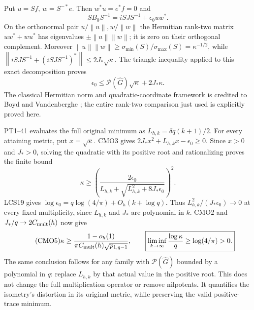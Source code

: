 \documentclass[11pt,a4paper]{article}
\providecommand{\norm}[1]{\left\lVert#1\right\rVert}
\begin{document}
Put $u=Sf$, $w=S^{-*}e$. Then
$w^*u=e^*f=0$ and
\[
 SB_0S^{-1}=iSJS^{-1}+\epsilon_0uw^*.
\]
On the orthonormal pair $u/\norm u,w/\norm w$ the Hermitian
rank-two matrix $uw^*+wu^*$ has eigenvalues
$\pm\norm u\norm w$; it is zero on their orthogonal complement.
Moreover
$\norm u\norm w\ge\sigma_{\min}(S)/\sigma_{\max}(S)
=\kappa^{-1/2}$, while
$\norm{iSJS^{-1}+(iSJS^{-1})^*}\le2J_*\sqrt\kappa$.
The triangle inequality applied to this exact decomposition proves
\begin{equation}\tag{CMO3}
 \boxed{\epsilon_0\le
       \mathcal P(\widehat G)\sqrt\kappa+2J_*\kappa.}
\end{equation}
The classical Hermitian norm and quadratic-coordinate framework is
credited to Boyd and Vandenberghe \cite[Appendix A.5]{a04cmo:Boyd};
the entire rank-two comparison just used is explicitly proved here.

PT1--41 evaluates the full original minimum as
$L_{h,k}=\delta q(k+1)/2$. For every attaining metric, put
$x=\sqrt\kappa$. CMO3 gives $2J_*x^2+L_{h,k}x-\epsilon_0\ge0$.
Since $x>0$ and $J_*>0$, solving the quadratic with its positive
root and rationalizing proves the finite bound
\begin{equation}\tag{CMO4}
 \boxed{\kappa\ge
 \left(\frac{2\epsilon_0}
 {L_{h,k}+\sqrt{L_{h,k}^2+8J_*\epsilon_0}}\right)^2.}
\end{equation}
LCS19 gives
$\log\epsilon_0=q\log(4/\pi)+O_h(k+\log q)$.
Thus $L_{h,k}^2/(J_*\epsilon_0)\to0$ at every fixed
multiplicity, since $L_{h,k}$ and $J_*$ are polynomial in $k$.
CMO2 and $J_*/q\to2C_{\rm mult}(h)$ now give
\begin{equation}\tag{CMO5}
 \kappa\ge
 \frac{1-o_h(1)}{\pi C_{\rm mult}(h)\sqrt{p_{1,q-1}}},
 \qquad
 \boxed{\liminf_{k\to\infty}\frac{\log\kappa}{q}
                         \ge\log(4/\pi)>0.}
\end{equation}
The same conclusion follows for any family with
$\mathcal P(\widehat G)$ bounded by a polynomial in $q$:
replace $L_{h,k}$ by that actual value in the positive root.
This does not change the full multiplication operator or remove
nilpotents. It quantifies the isometry's distortion in its original
metric, while preserving the valid positive-trace minimum.
\end{document}
